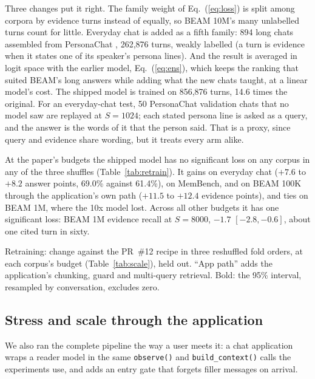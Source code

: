 Three changes put it right. The family weight of Eq.~(\ref{eq:loss}) is split
among corpora by evidence turns instead of equally, so BEAM 10M's many
unlabelled turns count for little. Everyday chat is added as a fifth family:
894 long chats assembled from PersonaChat \cite{zhang2018personachat}, 262,876
turns, weakly labelled (a turn is evidence when it states one of its
speaker's persona lines). And the result is averaged in logit space with the
earlier model, Eq.~(\ref{eq:ens}), which keeps the ranking that suited BEAM's
long answers while adding what the new chats taught, at a linear model's
cost. The shipped model is trained on 856,876 turns, 14.6 times the original.
For an everyday-chat test, 50 PersonaChat validation chats that no model saw
are replayed at $S=1024$; each stated persona line is asked as a query, and
the answer is the words of it that the person said. That is a proxy, since
query and evidence share wording, but it treats every arm alike.

At the paper's budgets the shipped model has no significant loss on any
corpus in any of the three shuffles (Table~\ref{tab:retrain}). It gains on
everyday chat ($+7.6$ to $+8.2$ answer points, 69.0\% against 61.4\%), on
MemBench, and on BEAM 100K through the application's own path ($+11.5$ to
$+12.4$ evidence points), and ties on BEAM 1M, where the 10x model lost. Across
all other budgets it has one significant loss: BEAM 1M evidence recall at
$S=8000$, $-1.7$ $[-2.8,-0.6]$, about one cited turn in sixty.

\begin{table}[t]
\caption{Retraining: change against the PR~\#12 recipe in three reshuffled
fold orders, at each corpus's budget (Table~\ref{tab:scale}), held out.
``App path'' adds the application's chunking, guard and multi-query
retrieval. Bold: the 95\% interval, resampled by conversation, excludes
zero.}
\label{tab:retrain}
\centering
\small
\begin{adjustbox}{max width=\columnwidth}\end{adjustbox}
\end{table}

\subsection{Stress and scale through the application}
\label{sec:stress}

We also ran the complete pipeline the way a user meets it: a chat
application wraps a reader model in the same \texttt{observe()} and
\texttt{build\_context()} calls the experiments use, and adds an entry gate
that forgets filler messages on arrival.

